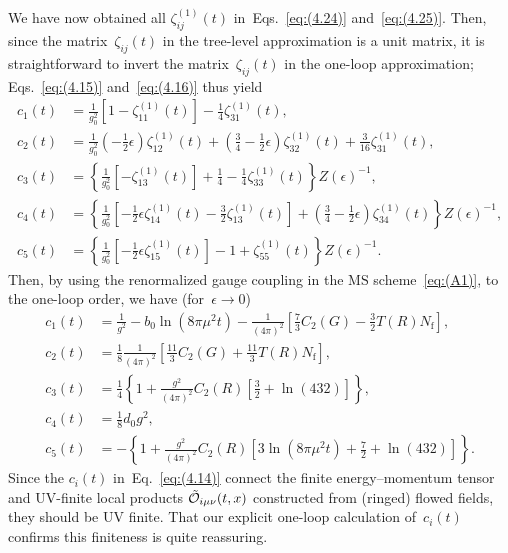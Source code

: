 We have now obtained all $\zeta_{ij}^{(1)}(t)$ in~Eqs.~\eqref{eq:(4.24)}
and~\eqref{eq:(4.25)}. Then, since the matrix~$\zeta_{ij}(t)$ in the tree-level
approximation is a unit matrix, it is straightforward to invert the
matrix~$\zeta_{ij}(t)$ in the one-loop approximation; Eqs.~\eqref{eq:(4.15)}
and~\eqref{eq:(4.16)} thus yield
\begin{align}
   c_1(t)&=\frac{1}{g_0^2}
   \left[1-\zeta_{11}^{(1)}(t)\right]
   -\frac{1}{4}\zeta_{31}^{(1)}(t),
\label{eq:(4.55)}\\
   c_2(t)&=\frac{1}{g_0^2}
   \left(-\frac{1}{2}\epsilon\right)\zeta_{12}^{(1)}(t)
   +\left(\frac{3}{4}-\frac{1}{2}\epsilon\right)\zeta_{32}^{(1)}(t)
   +\frac{3}{16}\zeta_{31}^{(1)}(t),
\label{eq:(4.56)}\\
   c_3(t)&=\left\{\frac{1}{g_0^2}
   \left[-\zeta_{13}^{(1)}(t)\right]
   +\frac{1}{4}-\frac{1}{4}\zeta_{33}^{(1)}(t)\right\}Z(\epsilon)^{-1},
\label{eq:(4.57)}\\
   c_4(t)&=\left\{\frac{1}{g_0^2}
   \left[-\frac{1}{2}\epsilon\zeta_{14}^{(1)}(t)
   -\frac{3}{2}\zeta_{13}^{(1)}(t)\right]
   +\left(\frac{3}{4}-\frac{1}{2}\epsilon\right)\zeta_{34}^{(1)}(t)\right\}
   Z(\epsilon)^{-1},
\label{eq:(4.58)}\\
   c_5(t)&=\left\{\frac{1}{g_0^2}
   \left[-\frac{1}{2}\epsilon\zeta_{15}^{(1)}(t)\right]
   -1+\zeta_{55}^{(1)}(t)\right\}Z(\epsilon)^{-1}.
\label{eq:(4.59)}
\end{align}
Then, by using the renormalized gauge coupling in the $\text{MS}$
scheme~\eqref{eq:(A1)}, to the one-loop order, we have (for~$\epsilon\to0$)
\begin{align}
   c_1(t)&
   =\frac{1}{g^2}-b_0\ln(8\pi\mu^2t)-\frac{1}{(4\pi)^2}
   \left[\frac{7}{3}C_2(G)
   -\frac{3}{2}T(R)N_{\mathrm{f}}\right],
\label{eq:(4.60)}\\
   c_2(t)&
   =\frac{1}{8}
   \frac{1}{(4\pi)^2}
   \left[\frac{11}{3}C_2(G)
   +\frac{11}{3}T(R)N_{\mathrm{f}}\right],
\label{eq:(4.61)}\\
   c_3(t)&
   =\frac{1}{4}\left\{1+\frac{g^2}{(4\pi)^2}C_2(R)
   \left[\frac{3}{2}+\ln(432)\right]\right\},
\label{eq:(4.62)}\\
   c_4(t)&=\frac{1}{8}d_0g^2,
\label{eq:(4.63)}\\
   c_5(t)&=-\left\{1+\frac{g^2}{(4\pi)^2}C_2(R)
   \left[3\ln(8\pi\mu^2t)+\frac{7}{2}+\ln(432)\right]\right\}.
\label{eq:(4.64)}
\end{align}
Since the $c_i(t)$ in~Eq.~\eqref{eq:(4.14)} connect the finite energy--momentum
tensor and UV-finite local products $\Tilde{\mathcal{O}}_{i\mu\nu}(t,x)$
constructed from (ringed) flowed fields, they should be UV finite. That our
explicit one-loop calculation of~$c_i(t)$ confirms this finiteness is quite
reassuring.

